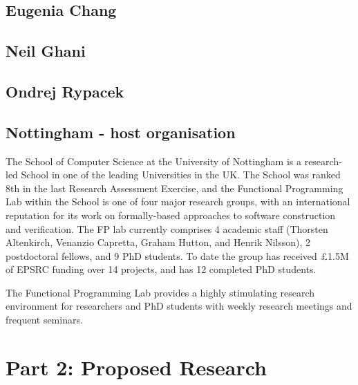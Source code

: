 \documentclass[a4paper]{article}
\renewcommand{\cite}[1]{{\tt[#1]}}
\newcommand{\citetrack}[1]{\cite{#1}}
\begin{document}
\subsection*{Eugenia Chang}

\subsection*{Neil Ghani}

\subsection*{Ondrej Rypacek}


\subsection*{Nottingham - host organisation}

The School of Computer Science at the University of Nottingham
is a research-led School in one of the leading Universities in
the UK.	 The School was ranked 8th in the last Research Assessment
Exercise, and the Functional Programming Lab within the School is
one of four major research groups, with an international reputation
for its work on formally-based approaches to software construction
and verification.  The FP lab currently comprises 4 academic staff
(Thorsten Altenkirch, Venanzio Capretta, Graham Hutton, and Henrik
Nilsson), 2 postdoctoral fellows, and 9 PhD students.  To date the
group has received \pounds 1.5M of EPSRC funding over 14 projects,
and has 12 completed PhD students.

The Functional Programming Lab provides a highly stimulating
research environment for researchers and PhD students with weekly
research meetings and frequent seminars. 



\newpage

\section*{Part 2: Proposed Research}
\end{document}
